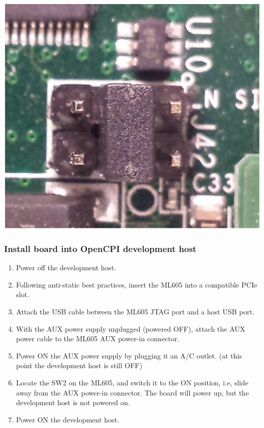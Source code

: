 \documentclass{article}
\begin{document}
\begin{enumerate}
\begin{center}
\includegraphics[scale=0.15]{ML605_J42.jpg}\par\bigskip
\end{center}
\end{enumerate}
\pagebreak
\subsubsection*{Install board into OpenCPI development host}
\begin{enumerate}
\item Power off the development host.
\item Following anti-static best practices, insert the ML605 into a compatible PCIe slot.
\item Attach the USB cable between the ML605 JTAG port and a host USB port.
\item With the AUX power supply unplugged (powered OFF), attach the AUX power cable to the ML605 AUX power-in connector.
\item Power ON the AUX power supply by plugging it an A/C outlet. (at this point the development host is still OFF)
\item Locate the SW2 on the ML605, and switch it to the ON position, i.e, slide away from the AUX power-in connector. The board will power up, but the development host is not powered on.
\item Power ON the development host.
\end{enumerate}
\end{document}
